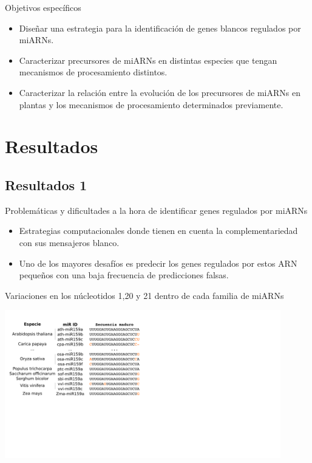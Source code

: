 \documentclass{beamer}
\begin{document}
\begin{frame}{Objetivos específicos}
		\pause
		\begin{itemize}
            \item<-2> Diseñar una estrategia para la identificación de genes blancos regulados por miARNs.
			\item<-1> Caracterizar precursores de miARNs en distintas especies que tengan mecanismos de procesamiento distintos.
			\item<-1> Caracterizar la relación entre la evolución de los precursores de miARNs en plantas y los mecanismos de procesamiento determinados previamente.
        \end{itemize}
\end{frame}


\section{Resultados}

\subsection{Resultados 1}



\begin{frame}{Problemáticas y dificultades a la hora de identificar genes regulados por miARNs}
	\begin{itemize}
		\item Estrategias computacionales donde tienen en cuenta la complementariedad con sus mensajeros blanco.
        \item Uno de los mayores desafíos es predecir los genes regulados por estos ARN pequeños con una baja frecuencia de predicciones falsas.
	\end{itemize}
\end{frame}

\begin{frame}{Variaciones en los núcleotidos 1,20 y 21 dentro de cada familia de miARNs}
    \begin{center}
        {\includegraphics[width=0.9\textwidth]{img/variacion00.png}}
    \end{center}
\end{frame}
\end{document}
